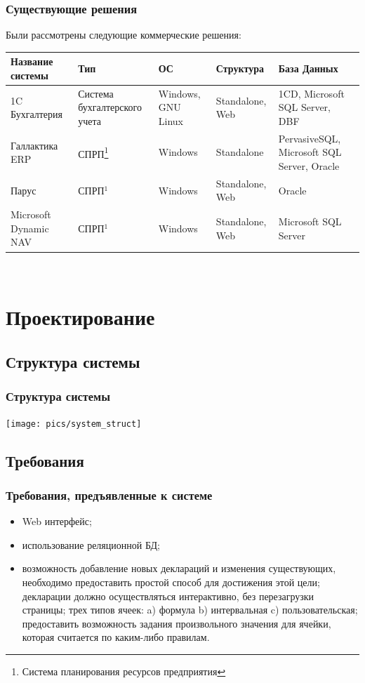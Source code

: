 \documentclass[xcolor=pdftex, dvipsnames, table]{beamer}
\begin{document}
\begin{frame}
  \frametitle{Существующие решения}
  Были рассмотрены следующие коммерческие решения:
  \begin{center}
    \small {
      \begin{tabular}{|p{2cm}|p{2cm}|p{1.5cm}|p{1.6cm}|p{2.3cm}|}\hline
        \bfseries{Название системы} &
        \bfseries{Тип} &
        \bfseries{ОС} &
        \bfseries{Структура} &
        \bfseries{База Данных}\\
        \hline
        1C Бухгалтерия & Система бухгалтерского учета & Windows, GNU Linux & Standalone, Web & 1CD, Microsoft SQL Server, DBF\\
        \hline
        Галлактика ERP & СПРП\footnote[1]{Система планирования ресурсов предприятия\label{erp}} & Windows  & Standalone  & PervasiveSQL, Microsoft SQL Server, Oracle\\
        \hline
        Парус & СПРП$^{1}$ & Windows & Standalone, Web & Oracle\\
        \hline
        Microsoft Dynamic NAV & СПРП$^{1}$ & Windows & Standalone, Web & Microsoft SQL Server\\
        \hline
      \end{tabular}
    }
  \end{center}
  \\
\end{frame}


\section{Проектирование}
\subsection{Структура системы}
\begin{frame}
  \frametitle{Структура системы}
  \begin{center}
    \texttt{[image: pics/system\_struct]}
  \end{center}
\end{frame}
\subsection{Требования}
\begin{frame}
  \frametitle{Требования, предъявленные к системе}
  \begin{itemize}
    \item Web интерфейс;
    \item использование реляционной БД;
    \item возможность добавление новых деклараций и изменения существующих, необходимо предоставить простой способ для достижения этой цели;
     декларации должно осуществляться интерактивно, без перезагрузки страницы;
     трех типов ячеек: a) формула b) интервальная c) пользовательская;
     предоставить возможность задания произвольного значения для ячейки, которая считается по каким-либо правилам.
  \end{itemize}
\end{frame}
\end{document}
